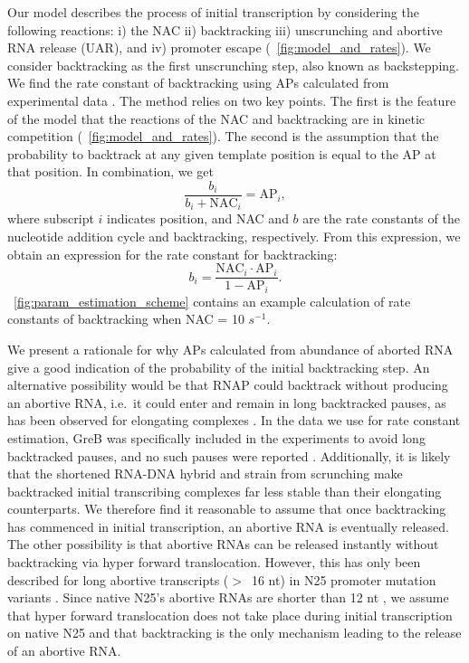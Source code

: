 %
Our model describes the process of initial transcription by considering the
following reactions: i) the NAC ii) backtracking iii) unscrunching and abortive
RNA release (UAR), and iv) promoter escape (\FIG~\ref{fig:model_and_rates}).
We consider backtracking as the first unscrunching step, also known as
backstepping. We find the rate constant of backtracking using APs calculated
from experimental data \cite{hsu_quantitative_1996}. The method relies on two
key points. The first is the feature of the model that the reactions of the
NAC and backtracking are in kinetic competition
(\FIG~\ref{fig:model_and_rates}). The second is the assumption that the
probability to backtrack at any given template position is equal to the AP at
that position. In combination, we get
\begin{equation*}
    \frac{b_i}{b_i + \text{NAC}_i} = \text{AP}_i,
\end{equation*}
where subscript $i$ indicates position, and NAC and $b$ are the rate constants
of the nucleotide addition cycle and backtracking, respectively. From this
expression, we obtain an expression for the rate constant for backtracking:
\begin{equation}
  b_i = \frac{\text{NAC}_i\cdot\text{AP}_i}{1-\text{AP}_i}.
  \label{eq:backtrackingcalc}
\end{equation}
\FIG~\ref{fig:param_estimation_scheme} contains an example calculation of rate
constants of backtracking when NAC = 10 $s^{-1}$.

We present a rationale for why APs calculated from abundance of aborted RNA
give a good indication of the probability of the initial backtracking step.
An alternative possibility would be that RNAP could backtrack without
producing an abortive RNA, i.e.\ it could enter and remain in long backtracked
pauses, as has been observed for elongating complexes
\cite{shaevitz_backtracking_2003}. In the data we use for rate constant
estimation, GreB was specifically included in the experiments to avoid long
backtracked pauses, and no such pauses were reported
\cite{revyakin_abortive_2006}. Additionally, it is likely that the shortened
RNA-DNA hybrid and strain from scrunching make backtracked initial
transcribing complexes far less stable than their elongating counterparts. We
therefore find it reasonable to assume that once backtracking has commenced in
initial transcription, an abortive RNA is eventually released. The other
possibility is that abortive RNAs can be released instantly without
backtracking via hyper forward translocation. However, this has only been
described for long abortive transcripts ($>$~16 nt) in N25 promoter mutation
variants \cite{chander_alternate_2007, chander_mechanisms_2015}. Since native
N25's abortive RNAs are shorter than 12 nt \cite{chander_alternate_2007}, we
assume that hyper forward translocation does not take place during initial
transcription on native N25 and that backtracking is the only mechanism
leading to the release of an abortive RNA.

